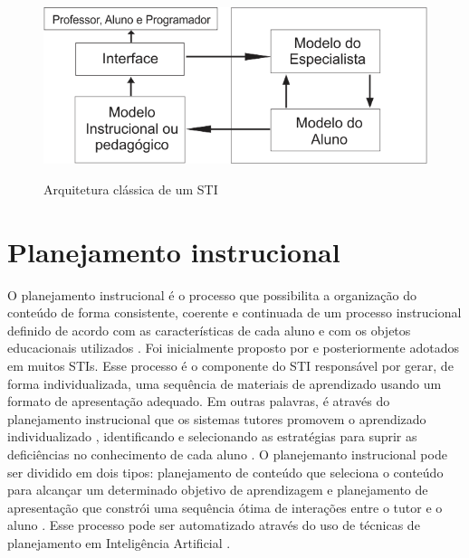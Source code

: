 \documentclass[
12pt,				%
oneside,			%
a4paper,			%
english,			%
brazil				%
]{abntex2ppgsi}
\begin{document}
%
\begin{figure}[H]%
	\centering
	\caption{Arquitetura clássica de um STI}
	\includegraphics{figura1.png}
	\label{fig:figura1}
\end{figure}

\section{Planejamento instrucional}
O planejamento instrucional é o processo que possibilita a organização do conteúdo de forma consistente, coerente e continuada de um processo instrucional definido de acordo com as características de cada aluno e com os objetos educacionais utilizados \cite{vassileva1996, mohan2003}. Foi inicialmente proposto por \cite{peachey1986} e posteriormente adotados em muitos STIs. Esse processo é o componente do STI responsável por gerar, de forma individualizada, uma sequência de materiais de aprendizado usando um formato de apresentação adequado. Em outras palavras, é através do planejamento instrucional que os sistemas tutores promovem o aprendizado individualizado \cite{mohan2003}, identificando e selecionando as estratégias para suprir as deficiências no conhecimento de cada aluno \cite{polson2013}.
O planejemanto instrucional pode ser dividido em dois tipos: planejamento de conteúdo que seleciona o conteúdo para alcançar um determinado objetivo de aprendizagem \cite{vassileva1996} e planejamento de apresentação que constrói uma sequência ótima de interações entre o tutor e o aluno \cite{mohan2003}. Esse processo pode ser automatizado através do uso de técnicas de planejamento em Inteligência Artificial \cite{cho2000, vassileva1996, brusilovsky2003, garrido2008}.
\end{document}
